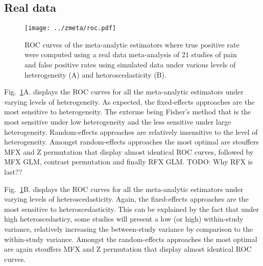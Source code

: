 \documentclass[preprint]{elsarticle}
\begin{document}
\subsection{Real data}




\begin{figure}[h]
	\centering
 	\texttt{[image: ../zmeta/roc.pdf]}
	\caption{ROC curves of the meta-analytic estimators where true positive rate were computed using a real data meta-analysis of 21 studies of pain and false positive rates using simulated data under various levels of heterogeneity (A) and hetoroscedasticity (B).}
	\label{fig_realdata}
\end{figure}


Fig.~\ref{fig_realdata}A. displays the ROC curves for all the meta-analytic estimators under varying levels of heterogeneity. As expected, the fixed-effects approaches are the most sensitive to heterogeneity. The exterme being Fisher's method that is the most sensitive under low heterogeneity and the less sensitive under large heterogeneity. Random-effects approaches are relatively insensitive to the level of heterogeneity. Amongst random-effects approaches the most optimal are stouffers MFX and Z permutation that display almost identical ROC curves, followed by MFX GLM, contrast permutation and finally RFX GLM. TODO: Why RFX is last??  

Fig.~\ref{fig_realdata}B. displays the ROC curves for all the meta-analytic estimators under varying levels of heteroscedasticity. Again, the fixed-effects approaches are the most sensitive to heteroscedasticity. This can be explained by the fact that under high heteroscedasticy, some studies will present a low (or high) within-study variance, relatively increasing the between-study variance by comparison to the within-study variance. Amongst the random-effects approaches the most optimal are again stouffers MFX and Z permutation that display almost identical ROC curves. 
\end{document}
